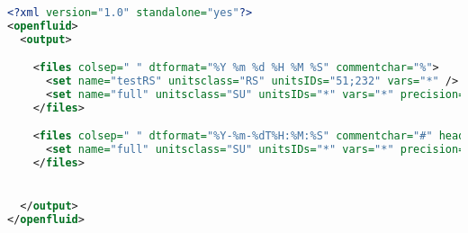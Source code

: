 \begin{lstlisting}[language=xml,title=\footnotesize\textit{example}]
<?xml version="1.0" standalone="yes"?>
<openfluid>
  <output>

    <files colsep=" " dtformat="%Y %m %d %H %M %S" commentchar="%">     
      <set name="testRS" unitsclass="RS" unitsIDs="51;232" vars="*" />
      <set name="full" unitsclass="SU" unitsIDs="*" vars="*" precision="7"/>
    </files>  

    <files colsep=" " dtformat="%Y-%m-%dT%H:%M:%S" commentchar="#" header="colnames-as-data">     
      <set name="full" unitsclass="SU" unitsIDs="*" vars="*" precision="7"/>
    </files>  


  </output>
</openfluid>
\end{lstlisting}

